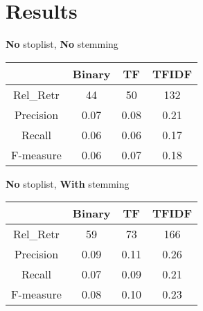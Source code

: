 \documentclass[12pt, a4paper]{article}
\begin{document}
\section{Results}
\begin{multicols}{2}
  \def\arraystretch{1.2}
  \textbf{No} stoplist, \textbf{No} stemming
  \begin{table}[H]
    \begin{tabular}{|c||c||c||c|}
    \hline
              & Binary & TF   & TFIDF \\ \hline
    Rel\_Retr & 44     & 50   & 132   \\ \hline
    Precision & 0.07   & 0.08 & 0.21  \\ \hline
    Recall    & 0.06   & 0.06 & 0.17  \\ \hline
    F-measure & 0.06   & 0.07 & 0.18  \\ \hline
    \end{tabular}
  \end{table}

  \columnbreak

  \textbf{No} stoplist, \textbf{With} stemming
  \begin{table}[H]
    \begin{tabular}{|c||c||c||c|}
    \hline
              & Binary & TF   & TFIDF \\ \hline
    Rel\_Retr & 59     & 73   & 166   \\ \hline
    Precision & 0.09   & 0.11 & 0.26  \\ \hline
    Recall    & 0.07   & 0.09 & 0.21  \\ \hline
    F-measure & 0.08   & 0.10 & 0.23  \\ \hline
    \end{tabular}
  \end{table}
\end{multicols}
\pagebreak
\end{document}
